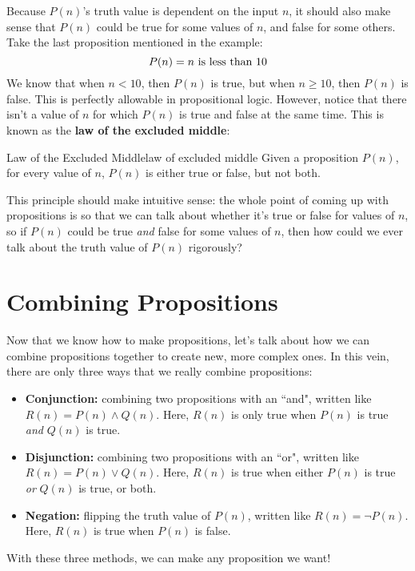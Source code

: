 Because \( P(n) \)'s truth value is dependent on the input \( n \), it should also make sense that 
\( P(n) \) could be true for some values of \( n \), and false for some others. Take the last proposition 
mentioned in the example:
\[
P(n) = \text{\( n \) is less than 10}
\] 
We know that when \( n < 10 \), then \( P(n) \) is true, but when \( n \ge  10 \), then \( P(n) \) is false. This is 
perfectly allowable in propositional logic. However, notice that there isn't a value of \( n \) for which 
\( P(n) \) is true and false at the same time. This is known as the \textbf{law of the excluded middle}:
\begin{theorem}{Law of the Excluded Middle}{law of excluded middle}
	Given a proposition \( P(n) \), for every value of \( n \), \( P(n) \) is either true or false, but not both.	
\end{theorem}
This principle should make intuitive sense: the whole point of coming up with propositions is so that we can talk 
about whether it's true or false for values of \( n \), so if \( P(n) \) could be true \textit{and} false for some 
values of \( n \), then how could we ever talk about the truth value of \( P(n) \) rigorously?

\section{Combining Propositions}
Now that we know how to make propositions, let's talk about how we can combine propositions together to create 
new, more complex ones. In this vein, there are only three ways that we really combine propositions:
\begin{itemize}
	\item \textbf{Conjunction:} combining two propositions with an ``and", written like 
		\( R(n) = P(n) \land Q(n) \). 
		Here, \( R(n) \) is only true when \( P(n) \) is true \textit{and} \( Q(n) \) is true. 
	\item \textbf{Disjunction:} combining two propositions with an ``or", written like \( R(n) = P(n) \lor Q(n) \). 
		Here, \( R(n) \) is true when either \( P(n) \) is true \textit{or} \( Q(n) \) is true, or both. 
	\item \textbf{Negation:} flipping the truth value of \( P(n) \), written like \( R(n) = \neg P(n) \). 
		Here, \( R(n) \) is true when \( P(n) \) is false. 
\end{itemize}
With these three methods, we can make any proposition we want!
